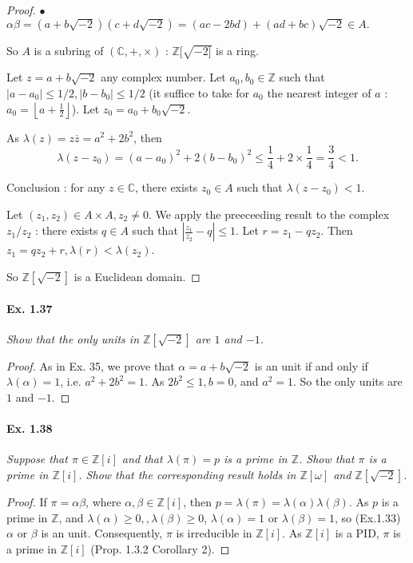 \documentclass[11pt,a4paper]{article}
\newcommand{\Z}{\mathbb{Z}}
\begin{document}
{\begin{proof}
$\bullet$  $\alpha \beta= (a + b \sqrt{-2}) (c + d\sqrt{-2}) = (ac -2 bd) + (ad+bc) \sqrt{-2} \in A.$

So $A$ is a subring of $(\mathbb{C},+,\times)$ : $\Z[\sqrt{-2]}$ is a ring.

Let $z = a + b\sqrt{-2}$ any complex number. Let $a_0, b_0 \in \Z$ such that $\vert a-a_0 \vert \leq 1/2, \vert b-b_0 \vert \leq 1/2$ (it suffice to take for $a_0$ the nearest integer of $a$ : $a_0 =\left \lfloor a + \frac{1}{2}\right \rfloor$). Let $z_0 = a_0 + b_0 \sqrt{-2}$.

As $\lambda(z) = z \overline{z} = a^2 + 2 b^2$, then 
$$\lambda(z-z_0) = (a-a_0)^2 + 2(b-b_0)^2 \leq \frac{1}{4} + 2 \times \frac{1}{4} = \frac{3}{4}<1.$$

Conclusion : for any $z \in \mathbb{C}$, there exists $z_0 \in A$ such that $\lambda(z-z_0) < 1$.

Let $(z_1,z_2) \in A \times A, z_2 \ne 0$. We apply the preeceeding result to the complex $z_1/z_2$ : there exists $q \in A$ such that $\left \vert \frac{z_1}{z_2} - q \right \vert \leq 1$. Let $r = z_1 - qz_2$. Then $z_1 = qz_2 +r, \lambda(r) < \lambda(z_2)$.

So $\Z[\sqrt{-2}]$ is a Euclidean domain.
\end{proof}

\paragraph{Ex. 1.37}

{\it Show that the only units in $\Z[\sqrt{-2}]$ are $1$ and $-1$.
}

\begin{proof}
As in Ex. 35, we prove that $\alpha = a + b\sqrt{-2}$ is an unit if and only if $\lambda(\alpha) = 1$, i.e. $a^2+2b^2 = 1$. As $2b^2 \leq 1, b = 0$, and $a^2 = 1$. So the only units are $1$ and $-1$.
\end{proof}

\paragraph{Ex. 1.38}

{\it Suppose that $\pi \in \Z[i]$ and that $\lambda(\pi) = p$ is a prime in $\Z$. Show that $\pi$ is a prime in $\Z[i]$. Show that the corresponding result holds in $\Z[\omega]$ and $\Z[\sqrt{-2}]$.
}

\begin{proof} If $\pi = \alpha \beta$, where $\alpha, \beta \in \Z[i]$, then $p = \lambda(\pi) = \lambda(\alpha) \lambda(\beta)$. As $p$ is a prime in $\Z$, and $\lambda(\alpha) \geq 0,,\lambda(\beta) \geq 0$, $\lambda(\alpha) = 1$ or $\lambda(\beta)=1$, so (Ex.1.33) $\alpha$ or $\beta$ is an unit. Consequently, $\pi$ is irreducible in $\Z[i]$. As $\Z[i]$ is a PID,  $\pi$ is a prime in $\Z[i]$ (Prop. 1.3.2 Corollary 2).


\end{proof}}
\end{document}
